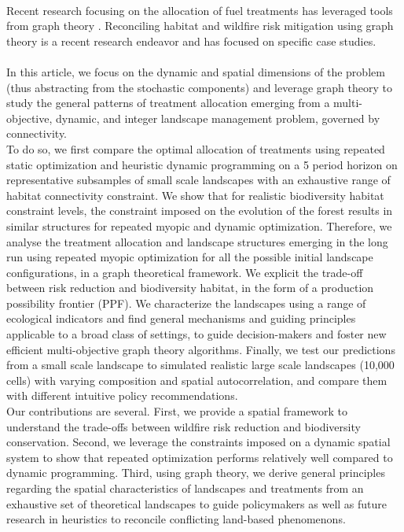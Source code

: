 \\
Recent research focusing on the allocation of fuel treatments has leveraged tools from graph theory \citep{matsypura_wildfire_2018, pais_downstream_2021}. Reconciling habitat and wildfire risk mitigation using graph theory is a recent research endeavor \citep{rachmawati_fuel_2018, yemshanov_exploring_2022} and has focused on specific case studies. 
\\\\
\hspace*{1.5em} In this article, we focus on the dynamic and spatial dimensions of the problem (thus abstracting from the stochastic components) and leverage graph theory to study the general patterns of treatment allocation emerging from a multi-objective, dynamic, and integer landscape management problem, governed by connectivity. \\
To do so, we first compare the optimal allocation of treatments using repeated static optimization and heuristic dynamic programming on a 5 period horizon on representative subsamples of small scale landscapes with an exhaustive range of habitat connectivity constraint. We show that for realistic biodiversity habitat constraint levels, the constraint imposed on the evolution of the forest results in similar structures for repeated myopic and dynamic optimization. Therefore, we analyse the treatment allocation and landscape structures emerging in the long run using repeated myopic optimization for all the possible initial landscape configurations, in a graph theoretical framework. We explicit the trade-off between risk reduction and biodiversity habitat, in the form of a production possibility frontier (PPF). We characterize the landscapes using a range of ecological indicators and find general mechanisms and guiding principles applicable to a broad class of settings, to guide decision-makers and foster new efficient multi-objective graph theory algorithms. Finally, we test our predictions from a small scale landscape to simulated realistic large scale landscapes (10,000 cells)  with varying composition and spatial autocorrelation, and compare them with different intuitive policy recommendations. 
\\
Our contributions are several. First, we provide a spatial framework to understand the trade-offs between wildfire risk reduction and biodiversity conservation. Second, we leverage the constraints imposed on a dynamic spatial system to show that repeated optimization performs relatively well compared to dynamic programming. Third, using graph theory, we derive general principles regarding the spatial characteristics of landscapes and treatments from an exhaustive set of theoretical landscapes to guide policymakers as well as future research in heuristics to reconcile conflicting land-based phenomenons.
